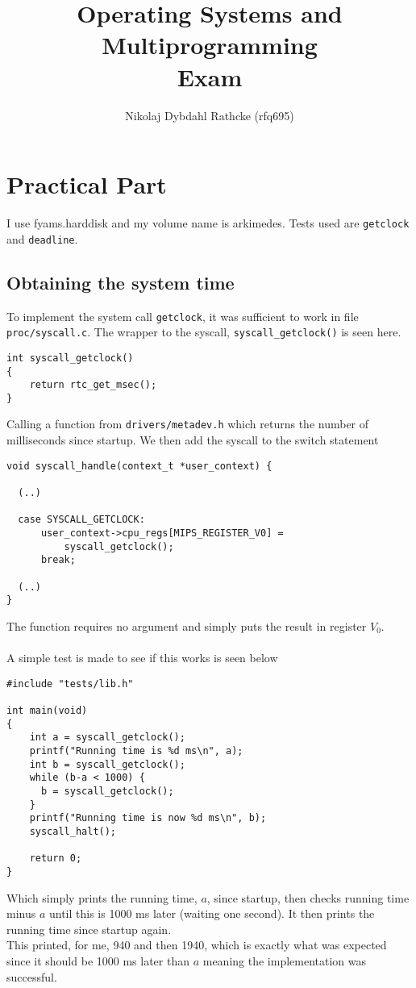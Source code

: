 \documentclass[12pt]{article}
\title{Operating Systems and Multiprogramming\\Exam}
\author{Nikolaj Dybdahl Rathcke (rfq695)}
\begin{document}
\maketitle
\newpage
\tableofcontents
\newpage

\section{Practical Part}
I use fyams.harddisk and my volume name is arkimedes. Tests used are \texttt{getclock} and \texttt{deadline}.
\subsection{Obtaining the system time}
To implement the system call \texttt{getclock}, it was sufficient to work in file \texttt{proc/syscall.c}. The wrapper to the syscall, \texttt{syscall\_getclock()} is seen here.
\begin{verbatim}
int syscall_getclock()
{
    return rtc_get_msec();
}
\end{verbatim}
Calling a function from \texttt{drivers/metadev.h} which returns the number of milliseconds since startup. We then add the syscall to the switch statement
\begin{verbatim}
void syscall_handle(context_t *user_context) {

  (..)
  
  case SYSCALL_GETCLOCK:
      user_context->cpu_regs[MIPS_REGISTER_V0] =
          syscall_getclock();
      break;
      
  (..)
}
\end{verbatim}
The function requires no argument and simply puts the result in register $V_0$.\\
\\
A simple test is made to see if this works is seen below
\begin{verbatim}
#include "tests/lib.h"

int main(void)
{     
    int a = syscall_getclock();
    printf("Running time is %d ms\n", a);
    int b = syscall_getclock();
    while (b-a < 1000) {
      b = syscall_getclock();
    }
    printf("Running time is now %d ms\n", b);   
    syscall_halt();

    return 0;
}
\end{verbatim}
Which simply prints the running time, $a$, since startup, then checks running time minus $a$ until this is 1000 ms later (waiting one second). It then prints the running time since startup again.\\
This printed, for me, 940 and then 1940, which is exactly what was expected since it should be 1000 ms later than $a$ meaning the implementation was successful.
\end{document}
